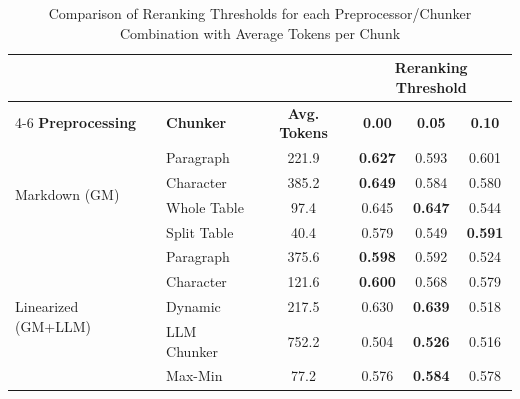 \documentclass[12pt]{article} %
\begin{document}
\begin{table}[htbp]
    \centering
    \small
    \setlength{\tabcolsep}{8pt}
    \renewcommand{\arraystretch}{1.1}
    \caption{Comparison of Reranking Thresholds for each Preprocessor/Chunker Combination with Average Tokens per Chunk}
    \label{tab:rag_correctness_eval_compact}
    \begin{tabular}{llcccc}
        \toprule
                               &                  &                      & \multicolumn{3}{c}{\textbf{Reranking Threshold}}                                   \\
        \cmidrule(lr){4-6}
        \textbf{Preprocessing} & \textbf{Chunker} & \textbf{Avg. Tokens} & \textbf{0.00}                                    & \textbf{0.05}  & \textbf{0.10}  \\
        \midrule
        \multirow{4}{*}{Markdown (GM)}
                               & Paragraph        & 221.9                & \textbf{0.627}                                   & 0.593          & 0.601          \\
                               & Character        & 385.2                & \textbf{0.649}                                   & 0.584          & 0.580          \\
                               & Whole Table      & 97.4                 & 0.645                                            & \textbf{0.647} & 0.544          \\
                               & Split Table      & 40.4                 & 0.579                                            & 0.549          & \textbf{0.591} \\
        \midrule
        \multirow{5}{*}{Linearized (GM+LLM)}
                               & Paragraph        & 375.6                & \textbf{0.598}                                   & 0.592          & 0.524          \\
                               & Character        & 121.6                & \textbf{0.600}                                   & 0.568          & 0.579          \\
                               & Dynamic          & 217.5                & 0.630                                            & \textbf{0.639} & 0.518          \\
                               & LLM Chunker      & 752.2                & 0.504                                            & \textbf{0.526} & 0.516          \\
                               & Max-Min          & 77.2                 & 0.576                                            & \textbf{0.584} & 0.578          \\
        \bottomrule
    \end{tabular}
\end{table}
\FloatBarrier
\end{document}
